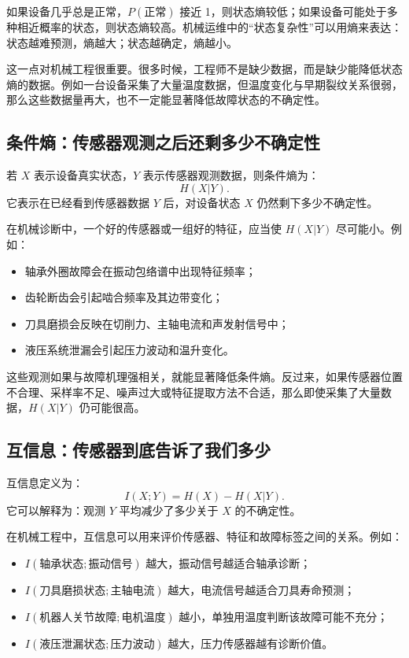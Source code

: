 \documentclass[UTF8,a4paper,12pt]{ctexart}
\begin{document}
如果设备几乎总是正常，$P(\text{正常})$ 接近 1，则状态熵较低；如果设备可能处于多种相近概率的状态，则状态熵较高。机械运维中的“状态复杂性”可以用熵来表达：状态越难预测，熵越大；状态越确定，熵越小。

这一点对机械工程很重要。很多时候，工程师不是缺少数据，而是缺少能降低状态熵的数据。例如一台设备采集了大量温度数据，但温度变化与早期裂纹关系很弱，那么这些数据量再大，也不一定能显著降低故障状态的不确定性。

\subsection{条件熵：传感器观测之后还剩多少不确定性}

若 $X$ 表示设备真实状态，$Y$ 表示传感器观测数据，则条件熵为：
\begin{equation}
H(X|Y).
\end{equation}
它表示在已经看到传感器数据 $Y$ 后，对设备状态 $X$ 仍然剩下多少不确定性。

在机械诊断中，一个好的传感器或一组好的特征，应当使 $H(X|Y)$ 尽可能小。例如：
\begin{itemize}
  \item 轴承外圈故障会在振动包络谱中出现特征频率；
  \item 齿轮断齿会引起啮合频率及其边带变化；
  \item 刀具磨损会反映在切削力、主轴电流和声发射信号中；
  \item 液压系统泄漏会引起压力波动和温升变化。
\end{itemize}

这些观测如果与故障机理强相关，就能显著降低条件熵。反过来，如果传感器位置不合理、采样率不足、噪声过大或特征提取方法不合适，那么即使采集了大量数据，$H(X|Y)$ 仍可能很高。

\subsection{互信息：传感器到底告诉了我们多少}

互信息定义为：
\begin{equation}
I(X;Y)=H(X)-H(X|Y).
\end{equation}
它可以解释为：观测 $Y$ 平均减少了多少关于 $X$ 的不确定性。

在机械工程中，互信息可以用来评价传感器、特征和故障标签之间的关系。例如：
\begin{itemize}
  \item $I(\text{轴承状态};\text{振动信号})$ 越大，振动信号越适合轴承诊断；
  \item $I(\text{刀具磨损状态};\text{主轴电流})$ 越大，电流信号越适合刀具寿命预测；
  \item $I(\text{机器人关节故障};\text{电机温度})$ 越小，单独用温度判断该故障可能不充分；
  \item $I(\text{液压泄漏状态};\text{压力波动})$ 越大，压力传感器越有诊断价值。
\end{itemize}
\end{document}
